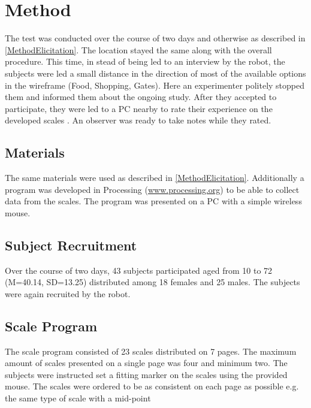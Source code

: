 \section{Method}
\label{Method2}
The test was conducted over the course of two days and otherwise as described in \autoref{MethodElicitation}. The location stayed the same along with the overall procedure. This time, in stead of being led to an interview by the robot, the subjects were led a small distance in the direction of most of the available options in the wireframe (Food, Shopping, Gates). Here an experimenter politely stopped them and informed them about the ongoing study. After they accepted to participate, they were led to a PC nearby to rate their experience on the developed scales . An observer was ready to take notes while they rated.

\subsection{Materials}
The same materials were used as described in \autoref{MethodElicitation}.  Additionally a program  was developed in Processing (\url{www.processing.org}) to be able to collect data from the scales. The program was presented on a PC with a simple wireless mouse.

\subsection{Subject Recruitment}
Over the course of two days, 43 subjects participated aged from 10 to 72 (M=40.14, SD=13.25) distributed among 18 females and 25 males. The subjects were again recruited by the robot.

\subsection{Scale Program}
The scale program consisted of 23 scales distributed on 7 pages. The maximum amount of scales presented on a single page was four and minimum two. The subjects were instructed set a fitting marker on the scales using the provided mouse. The scales were ordered to be as consistent on each page as possible e.g. the same type of scale with a mid-point